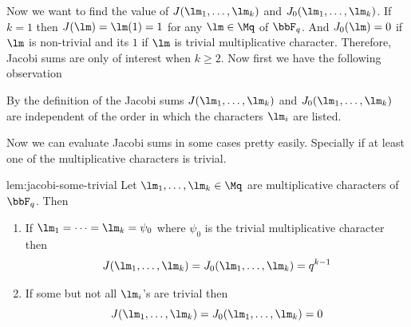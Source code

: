 Now we want to find the value of $J(\lm_1,\dots, \lm_k)$ and $J_0(\lm_1,\dots, \lm_k)$. If $k=1$ then $J(\lm)=\lm(1)=1$ for any $\lm\in\Mq$ of $\bbF_q$. And $J_0(\lm)=0$ if $\lm$ is non-trivial and its $1$ if $\lm$ is trivial multiplicative character. Therefore, Jacobi sums are only of interest when $k\geq 2$. Now first we have the following observation
\begin{observation}
  By the definition of the Jacobi sums $J(\lm_1,\dots, \lm_k)$ and $J_0(\lm_1,\dots, \lm_k)$ are independent of the order in which the characters $\lm_i$ are listed.
\end{observation} 

Now we can evaluate Jacobi sums in some cases pretty easily. Specially if at least one of the multiplicative characters is trivial. 
\begin{lemma}{}{lem:jacobi-some-trivial}
Let $\lm_1,\dots, \lm_k\in\Mq$ are multiplicative characters of $\bbF_q$. Then\begin{enumerate}[label=(\roman*)]
  \item If $\lm_1=\cdots=\lm_k=\psi_0$ where $\psi_0$ is the trivial multiplicative character then $$J(\lm_1,\dots, \lm_k)=J_0(\lm_1,\dots, \lm_k)=q^{k-1}$$
  \item If some but not all $\lm_i$'s are trivial then $$J(\lm_1,\dots, \lm_k)=J_0(\lm_1,\dots, \lm_k)=0$$
\end{enumerate}
\end{lemma}
